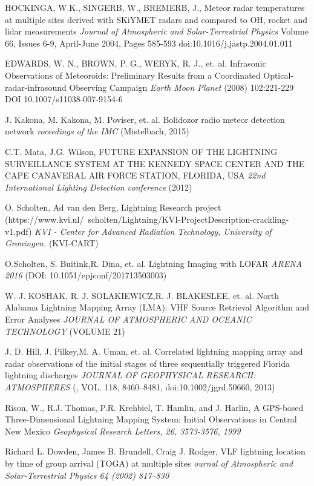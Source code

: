 \documentclass[twoside]{ctuthesis}
\theoremstyle{plain}
\theoremstyle{definition}
\theoremstyle{note}
\begin{document}
\begin{thebibliography}{99}
HOCKINGA, W.K., SINGERB, W., BREMERB, J.,
Meteor radar temperatures at multiple sites derived with SKiYMET radars and compared to OH, rocket and lidar measurements
\emph{Journal of Atmospheric and Solar-Terrestrial Physics}
Volume 66, Issues 6-9, April-June 2004, Pages 585-593
doi:10.1016/j.jastp.2004.01.011

EDWARDS, W. N., BROWN, P. G., WERYK, R. J., et. al.
Infrasonic Observations of Meteoroids: Preliminary Results from a Coordinated Optical-radar-infrasound Observing Campaign
\emph{Earth Moon Planet} (2008) 102:221-229
DOI 10.1007/s11038-007-9154-6

J. Kakona, M. Kakona, M. Poviser, et. al.
Bolidozor radio meteor detection network
\emph{roceedings of the IMC} (Mistelbach, 2015)


C.T. Mata, J.G. Wilson,
FUTURE EXPANSION OF THE LIGHTNING SURVEILLANCE SYSTEM AT THE KENNEDY SPACE CENTER AND THE CAPE CANAVERAL AIR FORCE STATION, FLORIDA, USA  
\emph{22nd International Lighting Detection conference} (2012) 

O. Scholten, Ad van den Berg,
Lightning Research project (https://www.kvi.nl/~scholten/Lightning/KVI-ProjectDescription-crackling-v1.pdf)
\emph{KVI - Center for Advanced Radiation Technology, University of Groningen.} (KVI-CART) 

O.Scholten, S. Buitink,R. Dina, et. al.
Lightning Imaging with LOFAR
\emph{ARENA 2016} (DOI: 10.1051/epjconf/201713503003) 

W. J. KOSHAK, R. J. SOLAKIEWICZ,R. J. BLAKESLEE, et. al.
North Alabama Lightning Mapping Array (LMA): VHF Source Retrieval Algorithm
and Error Analyses
\emph{JOURNAL OF ATMOSPHERIC AND OCEANIC TECHNOLOGY} (VOLUME 21) 

J. D. Hill, J. Pilkey,M. A. Uman, et. al.
Correlated lightning mapping array and radar observations of the initial stages of three sequentially triggered Florida lightning discharges
\emph{JOURNAL OF GEOPHYSICAL RESEARCH: ATMOSPHERES} (, VOL. 118, 8460–8481, doi:10.1002/jgrd.50660, 2013) 

Rison, W., R.J. Thomas, P.R. Krehbiel, T. Hamlin, and J. Harlin, A GPS-based Three-Dimensional Lightning Mapping System: Initial Observations in Central New Mexico
\emph{Geophysical Research Letters, 26, 3573-3576, 1999}

Richard L. Dowden,  James B. Brundell, Craig J. Rodger, 
VLF lightning location by time of group arrival (TOGA) at multiple sites
\emph{ournal of Atmospheric and Solar-Terrestrial Physics 64 (2002) 817–830}



\end{thebibliography}
\end{document}
